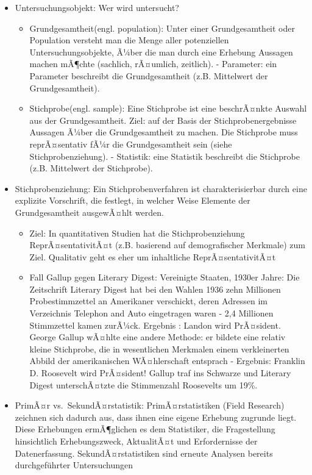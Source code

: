 \documentclass[
]{book}
\providecommand{\tightlist}{%
  \setlength{\itemsep}{0pt}\setlength{\parskip}{0pt}}
\begin{document}
\begin{itemize}
\tightlist
\item
  Untersuchungsobjekt: Wer wird untersucht?

  \begin{itemize}
  \tightlist
  \item
    Grundgesamtheit(engl. population): Unter einer Grundgesamtheit oder Population versteht man die Menge aller potenziellen Untersuchungsobjekte, Ã¼ber die man durch eine Erhebung Aussagen machen mÃ¶chte (sachlich, rÃ¤umlich, zeitlich).
    - Parameter: ein Parameter beschreibt die Grundgesamtheit (z.B. Mittelwert der Grundgesamtheit).
  \item
    Stichprobe(engl. sample): Eine Stichprobe ist eine beschrÃ¤nkte Auswahl aus der Grundgesamtheit. Ziel: auf der Basis der Stichprobenergebnisse Aussagen Ã¼ber die Grundgesamtheit zu machen. Die Stichprobe muss reprÃ¤sentativ fÃ¼r die Grundgesamtheit sein (siehe Stichprobenziehung).
    - Statistik: eine Statistik beschreibt die Stichprobe (z.B. Mittelwert der Stichprobe).
  \end{itemize}
\item
  Stichprobenziehung: Ein Stichprobenverfahren ist charakterisierbar durch eine explizite Vorschrift, die festlegt, in welcher Weise Elemente der Grundgesamtheit ausgewÃ¤hlt werden.

  \begin{itemize}
  \tightlist
  \item
    Ziel: In quantitativen Studien hat die Stichprobenziehung ReprÃ¤sentativitÃ¤t (z.B. basierend auf demografischer Merkmale) zum Ziel. Qualitativ geht es eher um inhaltliche ReprÃ¤sentativitÃ¤t
  \item
    Fall Gallup gegen Literary Digest: Vereinigte Staaten, 1930er Jahre: Die Zeitschrift Literary Digest hat bei den Wahlen 1936 zehn Millionen Probestimmzettel an Amerikaner verschickt, deren Adressen im Verzeichnis Telephon and Auto eingetragen waren - 2,4 Millionen Stimmzettel kamen zurÃ¼ck. Ergebnis : Landon wird PrÃ¤sident. George Gallup wÃ¤hlte eine andere Methode: er bildete eine relativ kleine Stichprobe, die in wesentlichen Merkmalen einem verkleinerten Abbild der amerikanischen WÃ¤hlerschaft entsprach - Ergebnis: Franklin D. Roosevelt wird PrÃ¤sident! Gallup traf ins Schwarze und Literary Digest unterschÃ¤tzte die Stimmenzahl Roosevelts um 19\%.
  \end{itemize}
\item
  PrimÃ¤r vs.~SekundÃ¤rstatistik: PrimÃ¤rstatistiken (Field Research) zeichnen sich dadurch aus, dass ihnen eine eigene Erhebung zugrunde liegt. Diese Erhebungen ermÃ¶glichen es dem Statistiker, die Fragestellung hinsichtlich Erhebungszweck, AktualitÃ¤t und Erfordernisse der Datenerfassung. SekundÃ¤rstatistiken sind erneute Analysen bereits durchgeführter Untersuchungen
\end{itemize}
\end{document}
